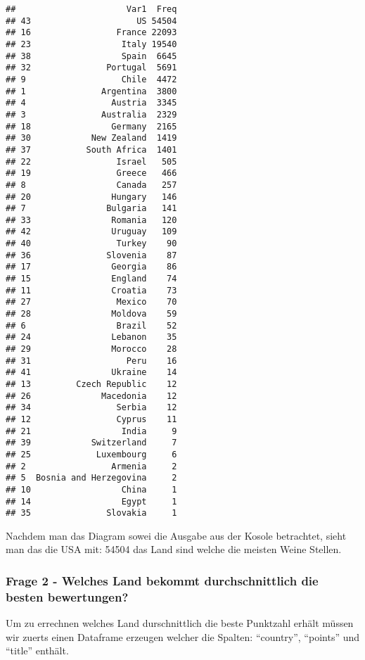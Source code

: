 \documentclass[
]{article}
\begin{document}
\begin{verbatim}
##                      Var1  Freq
## 43                     US 54504
## 16                 France 22093
## 23                  Italy 19540
## 38                  Spain  6645
## 32               Portugal  5691
## 9                   Chile  4472
## 1               Argentina  3800
## 4                 Austria  3345
## 3               Australia  2329
## 18                Germany  2165
## 30            New Zealand  1419
## 37           South Africa  1401
## 22                 Israel   505
## 19                 Greece   466
## 8                  Canada   257
## 20                Hungary   146
## 7                Bulgaria   141
## 33                Romania   120
## 42                Uruguay   109
## 40                 Turkey    90
## 36               Slovenia    87
## 17                Georgia    86
## 15                England    74
## 11                Croatia    73
## 27                 Mexico    70
## 28                Moldova    59
## 6                  Brazil    52
## 24                Lebanon    35
## 29                Morocco    28
## 31                   Peru    16
## 41                Ukraine    14
## 13         Czech Republic    12
## 26              Macedonia    12
## 34                 Serbia    12
## 12                 Cyprus    11
## 21                  India     9
## 39            Switzerland     7
## 25             Luxembourg     6
## 2                 Armenia     2
## 5  Bosnia and Herzegovina     2
## 10                  China     1
## 14                  Egypt     1
## 35               Slovakia     1
\end{verbatim}

Nachdem man das Diagram sowei die Ausgabe aus der Kosole betrachtet,
sieht man das die USA mit: 54504 das Land sind welche die meisten Weine
Stellen.

\subsubsection{Frage 2 - Welches Land bekommt durchschnittlich die
besten
bewertungen?}\label{frage-2---welches-land-bekommt-durchschnittlich-die-besten-bewertungen}

Um zu errechnen welches Land durschnittlich die beste Punktzahl erhält
müssen wir zuerts einen Dataframe erzeugen welcher die Spalten:
``country'', ``points'' und ``title'' enthält.
\end{document}
